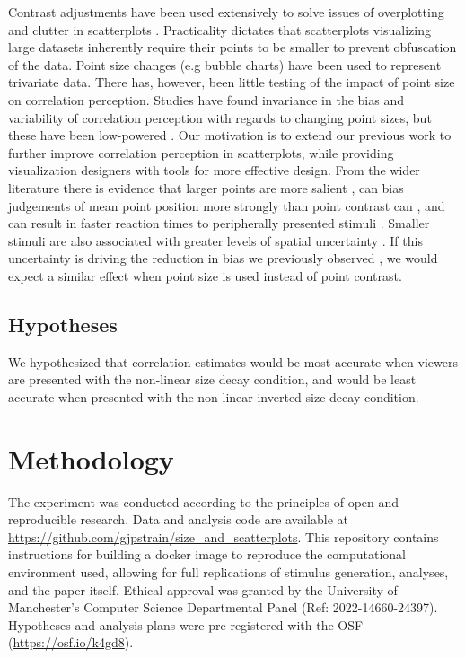 \documentclass{vgtc}                          %
\begin{document}
Contrast adjustments have been used extensively to solve issues of overplotting and clutter
in scatterplots \cite{matejka_2015, bertini_2004}. Practicality dictates that
scatterplots visualizing large datasets inherently require their points to be
smaller to prevent obfuscation of the data. Point size changes (e.g bubble charts)
have been used to represent trivariate data. There has, however, been little testing of the
impact of point size on correlation perception. Studies have found
invariance in the bias and variability of correlation
perception with regards to changing point sizes, but these have been low-powered
\cite{rensink_2012, rensink_2014}. Our motivation is to extend our previous work
\cite{strain_2023} to further improve correlation perception in scatterplots, while
providing visualization designers with tools for more effective design.
From the wider literature there is evidence that larger points are more salient
\cite{healey_2012}, can bias judgements of
mean point position more strongly than point contrast can \cite{hong_2021}, and can
result in faster reaction times to peripherally presented stimuli \cite{grice_1983}.
Smaller stimuli are also associated with greater levels of spatial uncertainty
\cite{alais_2004}. If this uncertainty is driving the reduction in bias we previously
observed \cite{strain_2023}, we would expect a similar effect when
point size is used instead of point contrast.

\hypertarget{hypotheses}{%
\subsection{Hypotheses}\label{hypotheses}}

We hypothesized that correlation estimates would be most accurate when
viewers are presented with the non-linear size decay condition, and would be
least accurate when presented with the non-linear inverted size decay condition.

\hypertarget{methodology}{%
\section{Methodology}\label{methodology}}

The experiment was conducted according to the principles of open and reproducible research.
Data and analysis code are available at \url{https://github.com/gjpstrain/size_and_scatterplots}.
This repository contains instructions for building a docker image to
reproduce the computational environment used, allowing for full replications
of stimulus generation, analyses, and the paper itself. Ethical approval was granted by the University
of Manchester's Computer Science Departmental Panel (Ref: 2022-14660-24397).
Hypotheses and analysis plans were pre-registered with the OSF (\url{https://osf.io/k4gd8}).
\end{document}
